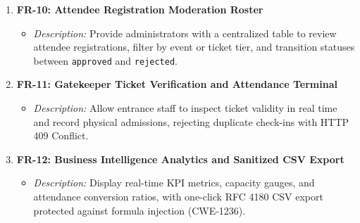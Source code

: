 \documentclass[11pt,a4paper]{report}
\begin{document}
\begin{enumerate}[leftmargin=1.5em, itemsep=0.8em]
    \item \textbf{FR-10: Attendee Registration Moderation Roster}
    \begin{itemize}[leftmargin=1.2em, itemsep=0.2em]
        \item \textit{Description:} Provide administrators with a centralized table to review attendee registrations, filter by event or ticket tier, and transition statuses between \texttt{approved} and \texttt{rejected}.
    \end{itemize}

    \item \textbf{FR-11: Gatekeeper Ticket Verification and Attendance Terminal}
    \begin{itemize}[leftmargin=1.2em, itemsep=0.2em]
        \item \textit{Description:} Allow entrance staff to inspect ticket validity in real time and record physical admissions, rejecting duplicate check-ins with HTTP 409 Conflict.
    \end{itemize}

    \item \textbf{FR-12: Business Intelligence Analytics and Sanitized CSV Export}
    \begin{itemize}[leftmargin=1.2em, itemsep=0.2em]
        \item \textit{Description:} Display real-time KPI metrics, capacity gauges, and attendance conversion ratios, with one-click RFC 4180 CSV export protected against formula injection (CWE-1236).
    \end{itemize}
\end{enumerate}
\end{document}
